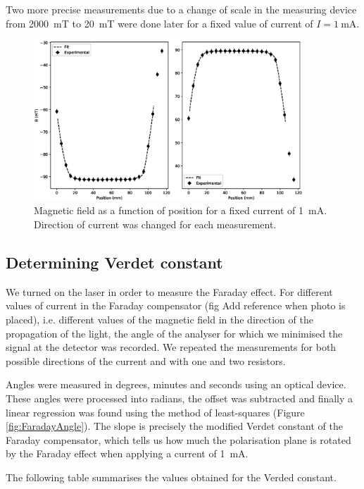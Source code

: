 \documentclass[11pt,a4paper]{article}
\begin{document}
Two more precise measurements due to a change of scale in the measuring device from \SI{2000}{mT} to \SI{20}{mT} were done later for a fixed value of current of $I=\SI{1}{\mA}$.

\begin{figure}[H]
\centering
\includegraphics[width=0.9\textwidth]{B_diff_position2.eps}
\caption{Magnetic field as a function of position for a fixed current of \SI{1}{\mA}. Direction of current was changed for each measurement.}
\label{fig:BvsPos2}
\end{figure}

\subsection{Determining Verdet constant}

We turned on the laser in order to measure the Faraday effect. For different values of current in the Faraday compensator (fig {\color{red}Add reference when photo is placed}), i.e. different values of the magnetic field in the direction of the propagation of the light, the angle of the analyser for which we minimised the signal at the detector was recorded. We repeated the measurements for both possible directions of the current and with one and two resistors.

Angles were measured in degrees, minutes and seconds using an optical device. These angles were processed into radians, the offset was subtracted and finally a linear regression was found using the method of least-squares (Figure \ref{fig:FaradayAngle}). The slope is precisely the modified Verdet constant of the Faraday compensator, which tells us how much the polarisation plane is rotated by the Faraday effect when applying a current of \SI{1}{mA}.

The following table summarises the values obtained for the Verded constant.
\end{document}
